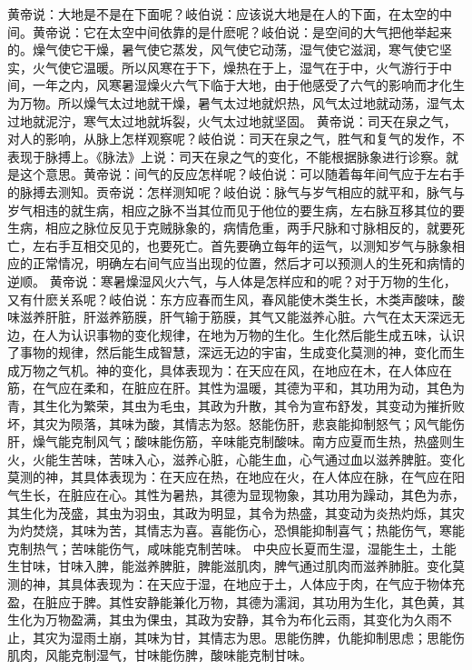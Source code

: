 \documentclass[a4paper,12pt,UTF8,twoside]{ctexbook}
\begin{document}
黄帝说：大地是不是在下面呢？岐伯说：应该说大地是在人的下面，在太空的中间。黄帝说：它在太空中间依靠的是什麽呢？岐伯说：是空间的大气把他举起来的。燥气使它干燥，暑气使它蒸发，风气使它动荡，湿气使它滋润，寒气使它坚实，火气使它温暖。所以风寒在于下，燥热在于上，湿气在于中，火气游行于中间，一年之内，风寒暑湿燥火六气下临于大地，由于他感受了六气的影响而才化生为万物。所以燥气太过地就干燥，暑气太过地就炽热，风气太过地就动荡，湿气太过地就泥泞，寒气太过地就坼裂，火气太过地就坚固。
黄帝说：司天在泉之气，对人的影响，从脉上怎样观察呢？岐伯说：司天在泉之气，胜气和复气的发作，不表现于脉搏上。《脉法》上说：司天在泉之气的变化，不能根据脉象进行诊察。就是这个意思。黄帝说：间气的反应怎样呢？岐伯说：可以随着每年间气应于左右手的脉搏去测知。贡帝说：怎样测知呢？岐伯说：脉气与岁气相应的就平和，脉气与岁气相违的就生病，相应之脉不当其位而见于他位的要生病，左右脉互移其位的要生病，相应之脉位反见于克贼脉象的，病情危重，两手尺脉和寸脉相反的，就要死亡，左右手互相交见的，也要死亡。首先要确立每年的运气，以测知岁气与脉象相应的正常情况，明确左右间气应当出现的位置，然后才可以预测人的生死和病情的逆顺。
黄帝说：寒暑燥湿风火六气，与人体是怎样应和的呢？对于万物的生化，又有什麽关系呢？岐伯说：东方应春而生风，春风能使木类生长，木类声酸味，酸味滋养肝脏，肝滋养筋膜，肝气输于筋膜，其气又能滋养心脏。六气在太天深远无边，在人为认识事物的变化规律，在地为万物的生化。生化然后能生成五味，认识了事物的规律，然后能生成智慧，深远无边的宇宙，生成变化莫测的神，变化而生成万物之气机。神的变化，具体表现为：在天应在风，在地应在木，在人体应在筋，在气应在柔和，在脏应在肝。其性为温暖，其德为平和，其功用为动，其色为青，其生化为繁荣，其虫为毛虫，其政为升散，其令为宣布舒发，其变动为摧折败坏，其灾为陨落，其味为酸，其情志为怒。怒能伤肝，悲哀能抑制怒气；风气能伤肝，燥气能克制风气；酸味能伤筋，辛味能克制酸味。南方应夏而生热，热盛则生火，火能生苦味，苦味入心，滋养心脏，心能生血，心气通过血以滋养脾脏。变化莫测的神，其具体表现为：在天应在热，在地应在火，在人体应在脉，在气应在阳气生长，在脏应在心。其性为暑热，其德为显现物象，其功用为躁动，其色为赤，其生化为茂盛，其虫为羽虫，其政为明显，其令为热盛，其变动为炎热灼烁，其灾为灼焚烧，其味为苦，其情志为喜。喜能伤心，恐惧能抑制喜气；热能伤气，寒能克制热气；苦味能伤气，咸味能克制苦味。
中央应长夏而生湿，湿能生土，土能生甘味，甘味入脾，能滋养脾脏，脾能滋肌肉，脾气通过肌肉而滋养肺脏。变化莫测的神，其具体表现为：在天应于湿，在地应于土，人体应于肉，在气应于物体充盈，在脏应于脾。其性安静能兼化万物，其德为濡润，其功用为生化，其色黄，其生化为万物盈满，其虫为倮虫，其政为安静，其令为布化云雨，其变化为久雨不止，其灾为湿雨土崩，其味为甘，其情志为思。思能伤脾，仇能抑制思虑；思能伤肌肉，风能克制湿气，甘味能伤脾，酸味能克制甘味。
\end{document}
